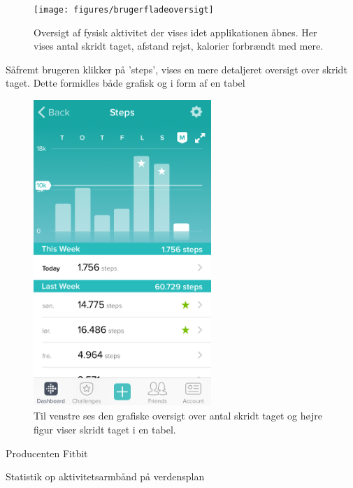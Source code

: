 \begin{figure}[H]
	\centering
	\texttt{[image: figures/brugerfladeoversigt]}
	\caption{Oversigt af fysisk aktivitet der vises idet applikationen åbnes. Her vises antal skridt taget, afstand rejst, kalorier forbrændt med mere.}
	\label{fig:brugerfladeoversigt}
\end{figure}


Såfremt brugeren klikker på 'steps', vises en mere detaljeret oversigt over skridt taget. Dette formidles både grafisk og i form af en tabel

\begin{figure}[H]
	\centering
	\includegraphics[width=0.6\textwidth]{figures/brugerfladesteps}
	\caption{Til venstre ses den grafiske oversigt over antal skridt taget og højre figur viser skridt taget i en tabel.}
	\label{fig:brugerfladesteps}
\end{figure}


 

Producenten Fitbit 			
			
			Statistik op aktivitetsarmbånd på verdensplan 

